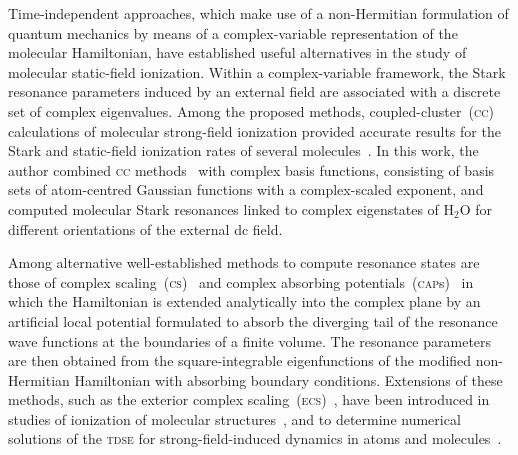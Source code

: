 
Time-independent approaches, which make use of a non-Hermitian
formulation of quantum mechanics by means of a complex-variable
representation of the molecular Hamiltonian, have established useful
alternatives in the study of molecular static-field ionization. Within
a complex-variable framework, the Stark resonance parameters induced
by an external field are associated with a discrete set of complex
eigenvalues. Among the proposed methods, coupled-cluster~(\textsc{cc})
calculations of molecular strong-field ionization provided accurate
results for the Stark and static-field ionization rates of several
molecules~\cite{Jagau_manybody_H2O}. In this work, the author combined
\textsc{cc} methods~\cite{cc_method} with complex basis functions,
consisting of basis sets of atom-centred Gaussian functions with a
complex-scaled exponent, and computed molecular Stark resonances
linked to complex eigenstates of H$_{2}$O for different orientations
of the external dc field.


Among alternative well-established methods to compute resonance states
are those of complex scaling~(\textsc{cs})~\cite{complexScalingSimon}
and complex absorbing potentials~(\textsc{cap}s)~\cite{RissMeyer_1993}
in which the Hamiltonian is extended analytically into the complex
plane by an artificial local potential formulated to absorb the
diverging tail of the resonance wave functions at the boundaries of a
finite volume. The resonance parameters are then obtained from the
square-integrable eigenfunctions of the modified non-Hermitian
Hamiltonian with absorbing boundary conditions. Extensions of these
methods, such as the exterior complex
scaling~(\textsc{ecs})~\cite{Simon_1979}, have been introduced in
studies of ionization of molecular
structures~\cite{ScrinziJChemPhys_ECS,ScrinziJPhysB_ECS}, and to
determine numerical solutions of the \textsc{tdse} for
strong-field-induced dynamics in atoms and
molecules~\cite{Krause_2014,ecsScrinzi,ecsRuiz}.

